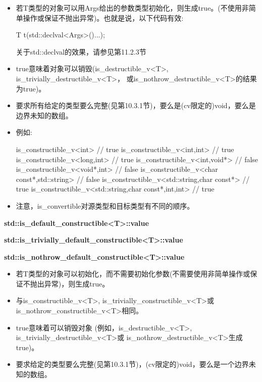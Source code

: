\begin{itemize}
\item 
若T类型的对象可以用Args给出的参数类型初始化，则生成true。(不使用非简单操作或保证不抛出异常)。也就是说，以下代码有效:

\begin{cpp}
T t(std::declval<Args>()...);
\end{cpp}

\begin{notice}
关于std::declval的效果，请参见第11.2.3节
\end{notice}

\item
true意味着对象可以销毁(is\_destructible\_v<T>, is\_trivially\_destructible\_v<T>， 或is\_nothrow\_destructible\_v<T>的结果为true)。

\item
要求所有给定的类型要么完整(见第10.3.1节)，要么是(cv限定的)void，要么是边界未知的数组。

\item
例如:
\begin{cpp}
is_constructible_v<int> // true
is_constructible_v<int,int> // true
is_constructible_v<long,int> // true
is_constructible_v<int,void*> // false
is_constructible_v<void*,int> // false
is_constructible_v<char const*,std::string> // false
is_constructible_v<std::string,char const*> // true
is_constructible_v<std::string,char const*,int,int> // true
\end{cpp}

\item
注意，is\_convertible对源类型和目标类型有不同的顺序。
\end{itemize}

\textbf{std::is\_default\_constructible<T>::value}

\textbf{std::is\_trivially\_default\_constructible<T>::value}

\textbf{std::is\_nothrow\_default\_constructible<T>::value}

\begin{itemize}
\item 
若T类型的对象可以初始化，而不需要初始化参数(不需要使用非简单操作或保证不抛出异常)，则生成true。

\item 
与is\_constructible\_v<T>, is\_trivially\_constructible\_v<T>或 is\_nothrow\_constructible\_v<T>相同。

\item 
true意味着可以销毁对象 (例如，is\_destructible\_v<T>, is\_trivially\_destructible\_v<T>或 is\_nothrow\_destructible\_v<T>生成true)。

\item 
要求给定的类型要么完整(见第10.3.1节)，(cv限定的)void，要么是一个边界未知的数组。
\end{itemize}

